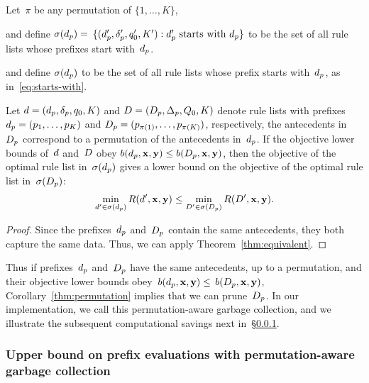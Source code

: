 \begin{corollary}
\label{thm:permutation}
Let~$\pi$ be any permutation of ${\{1, \dots, K\}}$,
\begin{arxiv}
and define ${\sigma(d_p) = }$
${\{(d_p', \delta_p', q_0', K') : d_p' \textnormal{ starts with } d_p \}}$
to be the set of all rule lists whose prefixes start with~$d_p$.
\end{arxiv}
\begin{kdd}
and define $\sigma(d_p)$
to be the set of all rule lists whose prefix starts with~$d_p$,
as in~\eqref{eq:starts-with}.
\end{kdd}
%
Let ${{d} = (d_p, \delta_p, q_0, K)}$
and ${{D} = (D_p, \Delta_p, Q_0, K)}$
denote rule lists with prefixes ${d_p = (p_1, \dots, p_K)}$
and ${D_p = (p_{\pi(1)}, \dots, p_{\pi(K)})}$,
respectively, \ie the antecedents in~$D_p$
correspond to a permutation of the antecedents in~$d_p$.
%
If the objective lower bounds of~${d}$ and~${D}$
obey ${b(d_p, \mathbf{x}, \mathbf{y}) \le b(D_p, \mathbf{x}, \mathbf{y})}$,
then the objective of the optimal rule list in~$\sigma(d_p)$ gives a
lower bound on the objective of the optimal rule list in~$\sigma(D_p)$:
\begin{align}
\min_{\RL' \in \StartsWith(\Prefix)} \Obj(\RL', \x, \y)
\le \min_{\RLB' \in \StartsWith(\PrefixB)} \Obj(\RLB', \x, \y).
\label{eq:permutation}
\end{align}
\end{corollary}

\begin{proof}
Since the prefixes~$d_p$ and~$D_p$ contain
the same antecedents, they both capture the same data.
Thus, we can apply Theorem~\ref{thm:equivalent}.
\end{proof}

Thus if prefixes~$d_p$ and~$D_p$ have the same antecedents,
up to a permutation, and their objective lower bounds
obey~${b(d_p, \mathbf{x}, \mathbf{y}) \le}$ ${b(D_p, \mathbf{x}, \mathbf{y})}$,
Corollary~\ref{thm:permutation} implies that we can prune~$D_p$.
%
In our implementation, we call this permutation-aware
garbage collection, and we illustrate the subsequent
computational savings next in~\S\ref{sec:permutation-counting}.

\subsubsection{Upper bound on prefix evaluations with permutation-aware garbage collection}
\label{sec:permutation-counting}

